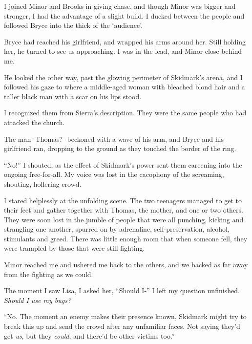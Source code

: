 I joined Minor and Brooks in giving chase, and though Minor was bigger and stronger, I had the advantage of a slight build.  I ducked between the people and followed Bryce into the thick of the `audience'.



Bryce had reached his girlfriend, and wrapped his arms around her.  Still holding her, he turned to see us approaching.  I was in the lead, and Minor close behind me.



He looked the other way, past the glowing perimeter of Skidmark's arena, and I followed his gaze to where a middle-aged woman with bleached blond hair and a taller black man with a scar on his lips stood.



I recognized them from Sierra's description.  They were the same people who had attacked the church.



The man -Thomas?- beckoned with a wave of his arm, and Bryce and his girlfriend ran, dropping to the ground as they touched the border of the ring.



``No!'' I shouted, as the effect of Skidmark's power sent them careening into the ongoing free-for-all.  My voice was lost in the cacophony of the screaming, shouting, hollering crowd.



I stared helplessly at the unfolding scene.  The two teenagers managed to get to their feet and gather together with Thomas, the mother, and one or two others.  They were soon lost in the jumble of people that were all punching, kicking and strangling one another, spurred on by adrenaline, self-preservation, alcohol, stimulants and greed.  There was little enough room that when someone fell, they were trampled by those that were still fighting.



Minor reached me and ushered me back to the others, and we backed as far away from the fighting as we could.



The moment I saw Lisa, I asked her, ``Should I-'' I left my question unfinished.  \emph{Should I use my bugs?}



``No.  The moment an enemy makes their presence known, Skidmark might try to break this up and send the crowd after any unfamiliar faces.  Not saying they'd get \emph{us}, but they \emph{could}, and there'd be other victims too.''



